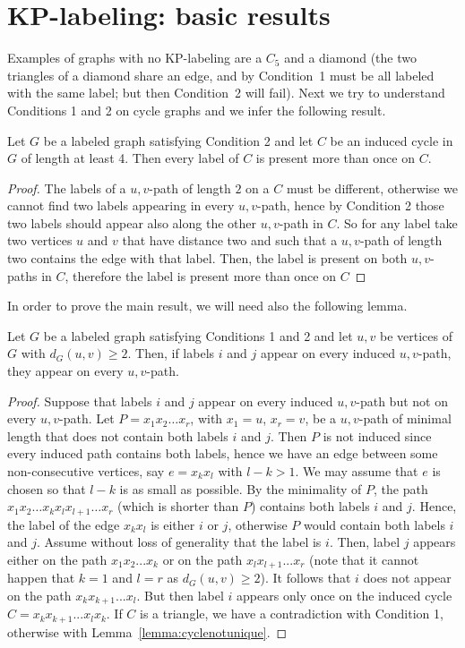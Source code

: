 \documentclass[12pt,a4paper,titlepage,openany]{report}
\begin{document}
\section{KP-labeling: basic results}
Examples of graphs with no KP-labeling are a $C_5$ and a diamond (the two triangles of a diamond share an edge, and by Condition~1 must be all labeled with the same label; but then Condition~2 will fail).\newline 
Next we try to understand Conditions 1 and 2 on cycle graphs and we infer the following result.
\begin{lemma}\label{lemma:cyclenotunique}Let $G$ be a labeled graph satisfying Condition 2 and let $C$ be an induced cycle in $G$ of length at least 4. Then every label of $C$ is present more than once on $C$.
\end{lemma}
\begin{proof}
The labels of a $u, v$-path of length $2$ on a $C$ must be different, otherwise we cannot find two labels appearing in every $u,v$-path, hence by Condition 2 those two labels should appear also along the other $u,v$-path in $C$. So for any label take two vertices $u$ and $v$ that have distance two and such that a $u,v$-path of length two contains the edge with that label. Then, the label is present on both $u,v$-paths in $C$, therefore the label is present more than once on $C$ 
\end{proof}
In order to prove the main result, we will need also the following lemma.
\begin{lemma}\label{lemma:inducedpaths}Let $G$ be a labeled graph satisfying Conditions 1 and 2 and let $u, v$ be vertices of $G$ with $d_G(u,v)\geq 2$. Then, if labels $i$ and $j$ appear on every induced $u, v$-path, they appear on every $u, v$-path.
\end{lemma}
\begin{proof}
Suppose that labels $i$ and $j$ appear on every induced \textsc{$u, v$}-path but not on every $u, v$-path. Let $P=x_1x_2\ldots x_r$, with $x_1=u$, $x_r=v$, be a $u, v$-path of minimal length that does not contain both labels $i$ and $j$. Then $P$ is not induced since every induced path contains both labels, hence we have an edge between some non-consecutive vertices, say $e=x_kx_l$ with $l-k>1$. We may assume that $e$ is chosen so that $l-k$ is as small as possible. By the minimality of $P$, the path $x_1x_2\ldots x_kx_lx_{l+1}\ldots x_r$ (which is shorter than $P$) contains both labels $i$ and $j$. Hence, the label of the edge $x_kx_l$ is either $i$ or $j$, otherwise $P$ would contain both labels $i$ and $j$. Assume without loss of generality that the label is $i$. Then, label $j$ appears either on the path $x_1x_2...x_k$ or on the path $x_lx_{l+1}...x_r$ (note that it cannot happen that $k=1$ and $l=r$ as $d_G(u,v)\geq 2$). It follows that $i$ does not appear on the path $x_kx_{k+1}...x_l$. But then label $i$ appears only once on the induced cycle $C=x_kx_{k+1}...x_lx_k$. If $C$ is a triangle, we have a contradiction with Condition 1, otherwise with Lemma~\ref{lemma:cyclenotunique}.
\end{proof}
\end{document}
